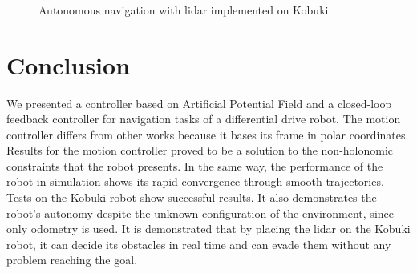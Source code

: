 \documentclass[conference]{IEEEtran}
\begin{document}
\begin{figure}
	\centering
	\\
	\\
	\\
	\caption{Autonomous navigation with lidar implemented on Kobuki} \label{f:kbki_lidar}
\end{figure}

\section{Conclusion}
\label{sec:conclusion}
We presented a controller based on Artificial Potential Field and a closed-loop feedback controller for navigation tasks of a differential drive robot. The motion controller differs from other works because it bases its frame in polar coordinates. Results for the motion controller proved to be a solution to the non-holonomic constraints that the robot presents. In the same way, the performance of the robot in simulation shows its rapid convergence through smooth trajectories.
Tests on the Kobuki robot show successful results. It also demonstrates the robot's autonomy despite the unknown configuration of the environment, since only odometry is used. It is demonstrated that by placing the lidar on the Kobuki robot, it can decide its obstacles in real time and can evade them without any problem reaching the goal.


\end{document}
